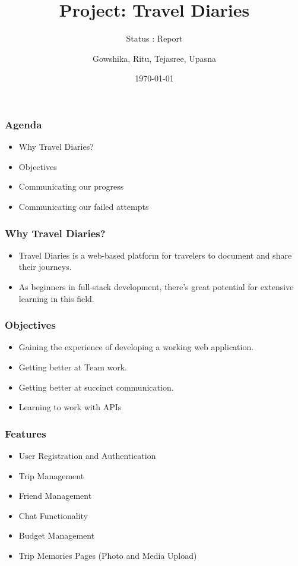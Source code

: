 \documentclass{beamer}
\title{Project: Travel Diaries}
\subtitle{Status : Report}
\author{Gowshika, Ritu, Tejasree, Upasna}
\date{\today}
\begin{document}
\frame{\titlepage}

\begin{frame}
    \frametitle{Agenda}
    \begin{itemize}
      \item Why Travel Diaries?
      \item Objectives
      \item Communicating our progress
      \item Communicating our failed attempts
    \end{itemize}
    \end{frame}

\begin{frame}
    \frametitle{Why Travel Diaries?}
    \begin{itemize}
        \item Travel Diaries is a web-based platform for travelers to document and share their journeys.
        \item As beginners in full-stack development, there's great potential for extensive learning in this field.
    \end{itemize}
\end{frame}

\begin{frame}
  \frametitle{Objectives}
  \begin{itemize}
    \item Gaining the experience of developing a working web application.
    \item Getting better at Team work.
    \item Getting better at succinct communication.
    \item Learning to work with APIs
  \end{itemize}
\end{frame}

\begin{frame}
  \frametitle{Features}
  \begin{itemize}
    \item User Registration and Authentication
    \item Trip Management
    \item Friend Management
    \item Chat Functionality
    \item Budget Management
    \item Trip Memories Pages (Photo and Media Upload)
  \end{itemize}
\end{frame}
\end{document}
